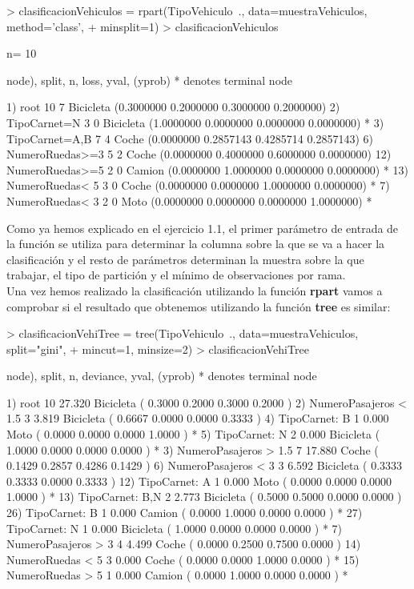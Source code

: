 \documentclass [a4paper] {article}
\begin{document}
\begin{Schunk}
\begin{Sinput}
> clasificacionVehiculos = rpart(TipoVehiculo~., data=muestraVehiculos, method='class',
+ minsplit=1)
> clasificacionVehiculos
\end{Sinput}
\begin{Soutput}
n= 10 

node), split, n, loss, yval, (yprob)
      * denotes terminal node

 1) root 10 7 Bicicleta (0.3000000 0.2000000 0.3000000 0.2000000)  
   2) TipoCarnet=N 3 0 Bicicleta (1.0000000 0.0000000 0.0000000 0.0000000) *
   3) TipoCarnet=A,B 7 4 Coche (0.0000000 0.2857143 0.4285714 0.2857143)  
     6) NumeroRuedas>=3 5 2 Coche (0.0000000 0.4000000 0.6000000 0.0000000)  
      12) NumeroRuedas>=5 2 0 Camion (0.0000000 1.0000000 0.0000000 0.0000000) *
      13) NumeroRuedas< 5 3 0 Coche (0.0000000 0.0000000 1.0000000 0.0000000) *
     7) NumeroRuedas< 3 2 0 Moto (0.0000000 0.0000000 0.0000000 1.0000000) *
\end{Soutput}
\end{Schunk}

Como ya hemos explicado en el ejercicio 1.1, el primer parámetro de entrada de la función se utiliza para determinar
la columna sobre la que se va a hacer la clasificación y el resto de parámetros determinan la muestra sobre la que trabajar, el 
tipo de partición y el mínimo de observaciones por rama.\\
Una vez hemos realizado la clasificación utilizando la función \textbf{rpart} vamos a comprobar si el resultado que obtenemos utilizando
la función \textbf{tree} es similar:

\begin{Schunk}
\begin{Sinput}
> clasificacionVehiTree = tree(TipoVehiculo~., data=muestraVehiculos, split="gini",
+ mincut=1, minsize=2)
> clasificacionVehiTree
\end{Sinput}
\begin{Soutput}
node), split, n, deviance, yval, (yprob)
      * denotes terminal node

 1) root 10 27.320 Bicicleta ( 0.3000 0.2000 0.3000 0.2000 )  
   2) NumeroPasajeros < 1.5 3  3.819 Bicicleta ( 0.6667 0.0000 0.0000 0.3333 )  
     4) TipoCarnet: B 1  0.000 Moto ( 0.0000 0.0000 0.0000 1.0000 ) *
     5) TipoCarnet: N 2  0.000 Bicicleta ( 1.0000 0.0000 0.0000 0.0000 ) *
   3) NumeroPasajeros > 1.5 7 17.880 Coche ( 0.1429 0.2857 0.4286 0.1429 )  
     6) NumeroPasajeros < 3 3  6.592 Bicicleta ( 0.3333 0.3333 0.0000 0.3333 )  
      12) TipoCarnet: A 1  0.000 Moto ( 0.0000 0.0000 0.0000 1.0000 ) *
      13) TipoCarnet: B,N 2  2.773 Bicicleta ( 0.5000 0.5000 0.0000 0.0000 )  
        26) TipoCarnet: B 1  0.000 Camion ( 0.0000 1.0000 0.0000 0.0000 ) *
        27) TipoCarnet: N 1  0.000 Bicicleta ( 1.0000 0.0000 0.0000 0.0000 ) *
     7) NumeroPasajeros > 3 4  4.499 Coche ( 0.0000 0.2500 0.7500 0.0000 )  
      14) NumeroRuedas < 5 3  0.000 Coche ( 0.0000 0.0000 1.0000 0.0000 ) *
      15) NumeroRuedas > 5 1  0.000 Camion ( 0.0000 1.0000 0.0000 0.0000 ) *
\end{Soutput}
\end{Schunk}
\end{document}
